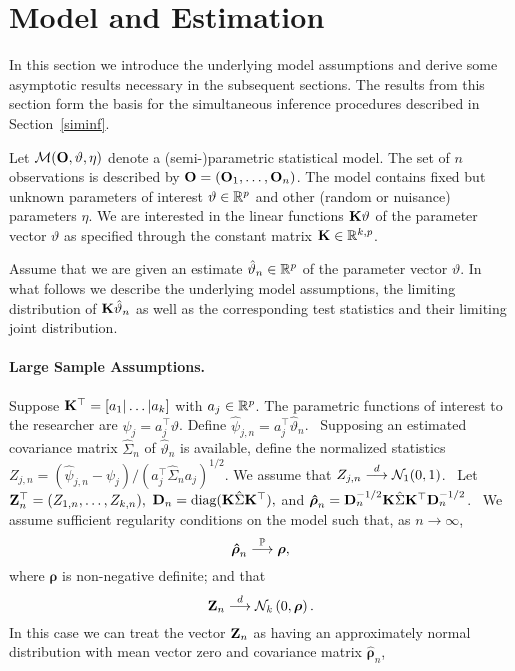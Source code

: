 \documentclass[12pt]{article}
\begin{document}
\section{Model and Estimation}

\label{model}

In this section we introduce the underlying model assumptions and derive
some asymptotic results necessary in the subsequent sections. The results
from this section form the basis for the simultaneous inference procedures
described in Section~\ref{siminf}.

Let $\mathcal{M}(\mathbf{O}, \vartheta, \eta)$ denote a (semi-)parametric statistical
model. The set of $n$ observations is described by $\Obs = (\Obs_1, \dots,
\Obs%
_n)$. The model contains fixed but unknown parameters of interest $\vartheta
\in \mathbb{R}^p$ and other (random or nuisance) parameters $\eta$. We are
interested in the linear functions $\mathbf{K} \vartheta$ of the parameter vector $%
\vartheta$ as specified through the constant matrix $\mathbf{K} \in \mathbb{R}^{k, p}$.

Assume that we are given an estimate $\hat{\vartheta}_n \in \mathbb{R}^p$ of the
parameter vector $\vartheta$. In what follows we describe the underlying
model assumptions, the limiting distribution of $\mathbf{K}\hat{\vartheta}_n$ as well
as the corresponding test statistics and their limiting joint distribution.

\paragraph{Large Sample Assumptions.}

Suppose $\mathbf{K}^\top=[a_{1}|\ldots |a_{k}]$ with $a_{j}\in \mathbb{R}^{p}$. The
parametric functions of interest to the researcher are $\psi_{j}=a_{j}^\top \vartheta $. 
Define 
$\hat{\psi}_{j,n}=a_{j}^\top \hat{\vartheta}_n$.
\ Supposing an estimated covariance matrix  $\hat{\Sigma}_n$ of
$\hat{\vartheta}_n$
is available, define the normalized statistics $Z_{j,n}=(\hat{\psi}_{j,n}-
\psi_{j})/(a_{j}^\top \hat{\Sigma}_na_{j})^{1/2}$. We assume
that $Z_{j,n} \stackrel{d}{\longrightarrow} \mathcal{N}_1(0, 1)$.
\ Let $%
\Z_{n}^\top=(Z_{1,n},\ldots ,Z_{k,n}),$ $\D_{n}=\text{diag}(\K\hat{\Sigma}\K%
^\top),$ and $\boldsymbol{\hat{\rho}}_{n}=\D_{n}^{-1/2}\K\hat{\Sigma}\K%
^\top \D_{n}^{-1/2}$. \ We assume sufficient regularity conditions on the
model such that, as $n\rightarrow \infty $,%
\[
\boldsymbol{\hat{\rho}}_{n} \stackrel{\mathbb{P}}{\longrightarrow} \boldsymbol{\rho },
\]%
where $\boldsymbol{\rho }$ is non-negative definite; and that 
\[
\mathbf{Z}_{n}\stackrel{d}{\longrightarrow}\mathcal{N}_{k}\left( 0,\boldsymbol{\rho }\right) .
\]%
In this case we can treat the vector $\mathbf{Z}_{n}$ as having an approximately
normal distribution with mean vector zero and covariance matrix  $%
\boldsymbol{\hat{\rho}}_{n}$,
\end{document}

